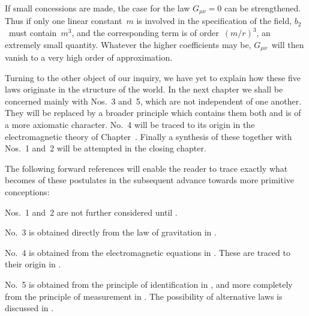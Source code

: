 \documentclass[12pt]{book}
\begin{document}
If small concessions are made, the case for the law $G_{\mu\nu} = 0$ can be
strengthened. Thus if only one linear constant~$m$ is involved in the specification
of the field, $b_{2}$~must contain~$m^{3}$, and the corresponding term is of order~$(m/r)^{3}$,
an extremely small quantity. Whatever the higher coefficients may
be, $G_{\mu\nu}$~will then vanish to a very high order of approximation.

Turning to the other object of our inquiry, we have yet to explain how
these five laws originate in the structure of the world. In the next chapter
we shall be concerned mainly with Nos.~3 and~5, which are not independent
of one another. They will be replaced by a broader principle which contains
them both and is of a more axiomatic character. No.~4 will be traced to its
origin in the electromagnetic theory of Chapter~\@. Finally a synthesis of
these together with Nos.~1 and~2 will be attempted in the closing chapter.

The following forward references will enable the reader to trace exactly
what becomes of these postulates in the subsequent advance towards more
primitive conceptions:

Nos.~1 and~2 are not further considered until .

No.~3 is obtained directly from the law of gravitation in .

No.~4 is obtained from the electromagnetic equations in . These are
traced to their origin in .

No.~5 is obtained from the principle of identification in , and more
completely from the principle of measurement in . The possibility of
alternative laws is discussed in .
\end{document}
